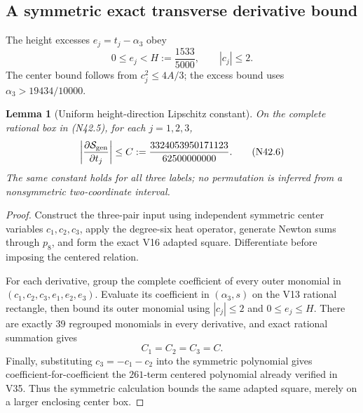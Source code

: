 \documentclass[11pt]{article}
\newtheorem{lemma}[theorem]{Lemma}
\theoremstyle{definition}
\theoremstyle{remark}
\begin{document}
\subsection{A symmetric exact transverse derivative bound}

The height excesses \(e_j=t_j-\alpha_3\) obey
\[
 0\leq e_j< H:=\frac{1533}{5000},
 \qquad
 |c_j|\leq2.
\tag{N42.5}
\]
The center bound follows from \(c_j^2\leq4A/3\); the excess bound uses
\(\alpha_3>19434/10000\).

\begin{lemma}[Uniform height-direction Lipschitz constant]
\label{lem:f2v42-transverse-bound}
On the complete rational box in \textup{(N42.5)}, for each
\(j=1,2,3\),
\[
 \left|\frac{\partial\mathcal S_{\rm gen}}{\partial t_j}\right|
 \leq
 C:=
 \frac{3324053950171123}{62500000000}.
\tag{N42.6}
\]
The same constant holds for all three labels; no permutation is inferred
from a nonsymmetric two-coordinate interval.
\end{lemma}

\begin{proof}
Construct the three-pair input using independent symmetric center
variables \(c_1,c_2,c_3\), apply the degree-six heat operator, generate
Newton sums through \(p_8\), and form the exact V16 adapted square.
Differentiate before imposing the centered relation.

For each derivative, group the complete coefficient of every outer
monomial in
\((c_1,c_2,c_3,e_1,e_2,e_3)\).  Evaluate its coefficient in
\((\alpha_3,s)\) on the V13 rational rectangle, then bound its outer
monomial using \(|c_j|\leq2\) and \(0\leq e_j\leq H\).
There are exactly \(39\) regrouped monomials in every derivative, and
exact rational summation gives
\[
 C_1=C_2=C_3=C.
\tag{N42.7}
\]
Finally, substituting \(c_3=-c_1-c_2\) into the symmetric polynomial gives
coefficient-for-coefficient the \(261\)-term centered polynomial already
verified in V35.  Thus the symmetric calculation bounds the same adapted
square, merely on a larger enclosing center box.
\end{proof}
\end{document}
